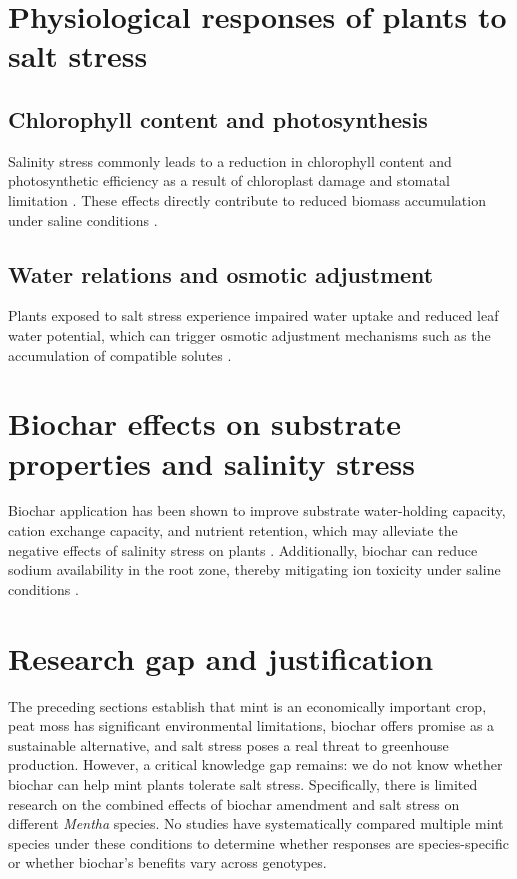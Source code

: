 \section{Physiological responses of plants to salt stress}

\subsection{Chlorophyll content and photosynthesis}
Salinity stress commonly leads to a reduction in chlorophyll content and photosynthetic efficiency as a result of chloroplast damage and stomatal limitation \textcite{Kalaji2021}. These effects directly contribute to reduced biomass accumulation under saline conditions \textcite{MunnsTester2008}.

\subsection{Water relations and osmotic adjustment}
Plants exposed to salt stress experience impaired water uptake and reduced leaf water potential, which can trigger osmotic adjustment mechanisms such as the accumulation of compatible solutes \textcite{AcostaMotos2017, Hussain2020}.

\section{Biochar effects on substrate properties and salinity stress}
Biochar application has been shown to improve substrate water-holding capacity, cation exchange capacity, and nutrient retention, which may alleviate the negative effects of salinity stress on plants \textcite{Akhtar2021}. Additionally, biochar can reduce sodium availability in the root zone, thereby mitigating ion toxicity under saline conditions \textcite{Joseph2021}.

\section{Research gap and justification}
The preceding sections establish that mint is an economically important crop, peat moss has significant environmental limitations, biochar offers promise as a sustainable alternative, and salt stress poses a real threat to greenhouse production. However, a critical knowledge gap remains: we do not know whether biochar can help mint plants tolerate salt stress. Specifically, there is limited research on the combined effects of biochar amendment and salt stress on different \textit{Mentha} species. No studies have systematically compared multiple mint species under these conditions to determine whether responses are species-specific or whether biochar's benefits vary across genotypes. 


